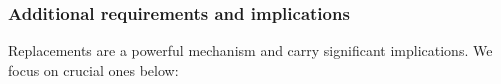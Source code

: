 



\subsubsection{Additional requirements and implications}
\label{replacedelement-additional}

Replacements are a powerful mechanism and carry significant
implications.  We focus on crucial ones below:

